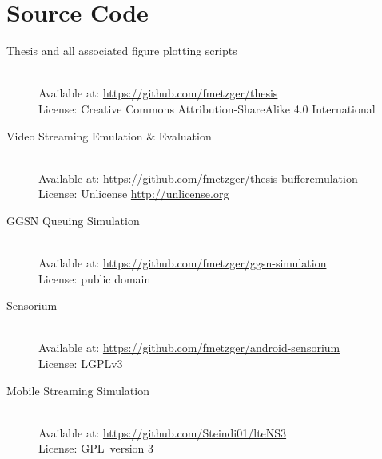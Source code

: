 \chapter*{Source Code}
%

\begin{description}
	\item[Thesis and all associated figure plotting scripts]\hfill \\
	Available at: \url{https://github.com/fmetzger/thesis} \\ %
	License: Creative Commons Attribution-ShareAlike 4.0 International \cite{ccbysa40}

	\item[Video Streaming Emulation \& Evaluation]\hfill \\
	Available at: \url{https://github.com/fmetzger/thesis-bufferemulation} \\
	License: Unlicense \url{http://unlicense.org}

	\item[\acrshort{GGSN} Queuing Simulation]\hfill \\
	Available at: \url{https://github.com/fmetzger/ggsn-simulation} \\
	License: public domain

	\item[Sensorium]\hfill \\
	Available at: \url{https://github.com/fmetzger/android-sensorium} \\
	License: \gls{LGPLv3}~\cite{lgplv3}

	\item[Mobile Streaming Simulation]\hfill \\
	Available at: \url{https://github.com/Steindi01/lteNS3} \\
	License: \gls{GPL}~version 3~\cite{gplv3}

\end{description}